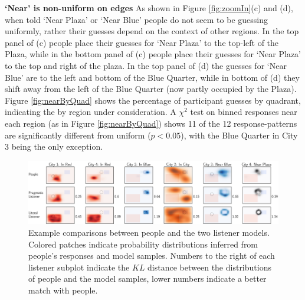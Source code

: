 \documentclass[10pt,letterpaper]{article}
\begin{document}
\textbf{`Near' is non-uniform on edges} As shown in Figure \ref{fig:zoomIn}(c) and (d), when told `Near Plaza' or `Near Blue' people do not seem to be guessing uniformly, rather their guesses depend on the context of other regions. In the top panel of (c) people place their guesses for `Near Plaza' to the top-left of the Plaza, while in the bottom panel of (c) people place their guesses for `Near Plaza' to the top and right of the plaza. In the top panel of (d) the guesses for `Near Blue' are to the left and bottom of the Blue Quarter, while in bottom of (d) they shift away from the left of the Blue Quarter (now partly occupied by the Plaza). Figure \ref{fig:nearByQuad} shows the percentage of participant guesses by quadrant, indicating the by region under consideration. A $\chi^2$ test on binned responses near each region (as in Figure \ref{fig:nearByQuad}) shows 11 of the 12 response-patterns are significantly different from uniform ($p<0.05$), with the Blue Quarter in City 3 being the only exception. 
\begin{figure}[!t]
\center
\vspace{-20pt}
\includegraphics[width=\textwidth]{figures/Figure4.pdf}
\caption{Example comparisons between people and the two listener models. Colored patches indicate probability distributions inferred from people's responses and model samples. Numbers to the right of each listener subplot indicate the $KL$ distance between the distributions of people and the model samples, lower numbers indicate a better match with people.}
\label{fig:modelExamples}
\end{figure}
\end{document}
